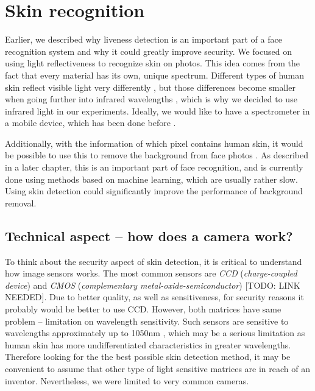 \chapter{Skin recognition}
    Earlier, we described why liveness detection is an important part
    of a face recognition system and why it could greatly improve security.
    We focused on using light reflectiveness to recognize skin on photos.
    This idea comes from the fact that every material has its own, unique spectrum.
    Different types of human skin reflect visible light very differently
    \cite{hsreflectance},
    but those differences become smaller when going further into infrared wavelengths
    \cite{visinfra} \cite{toyotaskin}, which is why we decided to use infrared light
    in our experiments.
    Ideally, we would like to have a spectrometer in a mobile device,
    which has been done before \cite{spectrometerphone}.

    Additionally, with the information of which pixel contains human skin,
    it would be possible to use this to remove the background from face
    photos \cite{colorstudy}.
    As described in a later chapter, this is an important part of face recognition,
    and is currently done using methods based on machine learning, which are usually
    rather slow.
    Using skin detection could significantly improve the performance of background
    removal.

    \section{Technical aspect -- how does a camera work?}
        To think about the security aspect of skin detection,
        it is critical to understand how image sensors works.
        The most common sensors are \textit{CCD} (\textit{charge-coupled device})
        and \textit{CMOS} (\textit{complementary metal-oxide-semiconductor})
        [TODO: LINK NEEDED].
        Due to better quality, as well as sensitiveness, for security reasons
        it probably would be better to use CCD.
        However, both matrices have same problem -- limitation on wavelength sensitivity.
        Such sensors are sensitive to wavelengths approximately up to 1050nm
        \cite{imagesensorsmax},
        which may be a serious limitation as human skin has more undifferentiated
        characteristics in greater wavelengths.
        Therefore looking for the the best possible skin detection method,
        it may be convenient to assume that other type of light sensitive matrices
        are in reach of an inventor.
        Nevertheless, we were limited to very common cameras.

